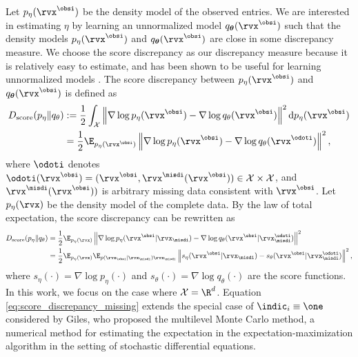 \documentclass{article} %
\begin{document}
Let $p_{\eta}(\rvx^{\obsi})$ be the density model of the observed entries. We are interested in estimating $\eta$ by learning an unnormalized model $q_{\bm{\theta}}(\rvx^{\obsi})$ such that the density models $p_{\eta}(\rvx^{\obsi})$ and $q_{\bm{\theta}}(\rvx^{\obsi})$ are close in some discrepancy measure. We choose the score discrepancy as our discrepancy measure because it is relatively easy to estimate, and has been shown to be useful for learning unnormalized models \citep{Song2019}. The score discrepancy between $p_{\eta}(\rvx^{\obsi})$ and $q_{\bm{\theta}}(\rvx^{\obsi})$ is defined as \citep{Song2019}
\begin{align}
	D_{\text{score}}(p_{\eta} \| q_{\theta}) &:= \frac{1}{2} \int_{\mathcal{X}} \left\| \nabla \log p_{\eta}(\rvx^{\obsi}) - \nabla \log q_{\theta}(\rvx^{\obsi}) \right\|^{2} \mathrm{d} p_{\eta}(\rvx^{\obsi}) \notag \\ 
	& = \frac{1}{2} \E_{p_{\eta}(\rvx^{\obsi})} \left\| \nabla \log p_{\eta}(\rvx^{\obsi}) - \nabla \log q_{\theta}(\rvx^{\odoti}) \right\|^{2}, \label{eq:score_discrepancy}
\end{align}
where $\odoti$ denotes $\odoti(\rvx^{\obsi}) = (\rvx^{\obsi}, \rvx^{\misdi}(\rvx^{\obsi})) \in \mathcal{X} \times \mathcal{X}$, and $\rvx^{\misdi}(\rvx^{\obsi}))$ is arbitrary missing data consistent with $\rvx^{\obsi}$.
Let $p_{\eta}(\rvx)$ be the density model of the complete data. By the law of total expectation, the score discrepancy can be rewritten as 
\begin{align}
	D_{\text{score}}(p_{\eta} \| q_{\theta}) &= \frac{1}{2} \E_{p_{\eta}(\rvx)} \left\| \nabla \log p_{\eta}(\rvx^{\obsi} | \rvx_{\misdi}) - \nabla \log q_{\theta}(\rvx^{\obsi} | \rvx_{\misdi}^{\odoti}) \right\|^{2} \notag \\ 
	& = \frac{1}{2} \E_{p_{\eta}(\rvx)} \E_{p(\rvx_{\obsi} | \rvx_{\misdi}) \rvx_{\misdi}} \left\| s_{\eta}(\rvx^{\obsi} | \rvx_{\misdi}) - s_{\theta}(\rvx^{\obsi} | \rvx_{\misdi}^{\odoti}) \right\|^{2}, \label{eq:score_discrepancy_missing}
\end{align}
where $s_{\eta}(\cdot) = \nabla \log p_{\eta}(\cdot)$ and $s_{\theta}(\cdot) = \nabla \log q_{\theta}(\cdot)$ are the score functions. In this work, we focus on the case where $\mathcal{X} = \R^{d}$. Equation \eqref{eq:score_discrepancy_missing} extends the special case of $\indic_{i} \equiv \one$ considered by Giles, who proposed the multilevel Monte Carlo method, a numerical method for estimating the expectation in the expectation-maximization algorithm in the setting of stochastic differential equations.
\end{document}

